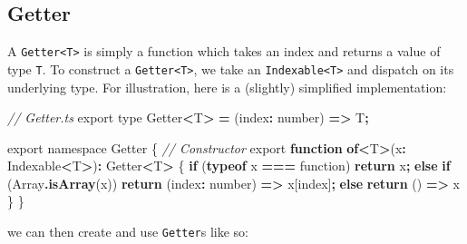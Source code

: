 \documentclass[
]{book}
\newenvironment{Shaded}{\begin{snugshade}}{\end{snugshade}}
\newcommand{\BuiltInTok}[1]{#1}
\newcommand{\CommentTok}[1]{\textcolor[rgb]{0.56,0.35,0.01}{\textit{#1}}}
\newcommand{\ControlFlowTok}[1]{\textcolor[rgb]{0.13,0.29,0.53}{\textbf{#1}}}
\newcommand{\DataTypeTok}[1]{\textcolor[rgb]{0.13,0.29,0.53}{#1}}
\newcommand{\FunctionTok}[1]{\textcolor[rgb]{0.13,0.29,0.53}{\textbf{#1}}}
\newcommand{\ImportTok}[1]{#1}
\newcommand{\KeywordTok}[1]{\textcolor[rgb]{0.13,0.29,0.53}{\textbf{#1}}}
\newcommand{\NormalTok}[1]{#1}
\newcommand{\OperatorTok}[1]{\textcolor[rgb]{0.81,0.36,0.00}{\textbf{#1}}}
\newcommand{\VerbatimStringTok}[1]{\textcolor[rgb]{0.31,0.60,0.02}{#1}}
\theoremstyle{definition}
\theoremstyle{definition}
\theoremstyle{definition}
\theoremstyle{definition}
\theoremstyle{remark}
\begin{document}
\subsection{Getter}\label{Getter}

A \texttt{Getter\textless{}T\textgreater{}} is simply a function which takes an index and returns a value of type \texttt{T}. To construct a \texttt{Getter\textless{}T\textgreater{}}, we take an \texttt{Indexable\textless{}T\textgreater{}} and dispatch on its underlying type. For illustration, here is a (slightly) simplified implementation:

\begin{Shaded}
\begin{Highlighting}[]
\CommentTok{// Getter.ts}
\ImportTok{export type}\NormalTok{ Getter}\OperatorTok{\textless{}}\NormalTok{T}\OperatorTok{\textgreater{}} \OperatorTok{=}\NormalTok{ (index}\OperatorTok{:} \DataTypeTok{number}\NormalTok{) }\KeywordTok{=\textgreater{}}\NormalTok{ T}\OperatorTok{;}

\ImportTok{export} \ImportTok{namespace} \DataTypeTok{Getter}\NormalTok{ \{}
  \CommentTok{// Constructor}
  \ImportTok{export} \KeywordTok{function} \KeywordTok{of}\OperatorTok{\textless{}}\NormalTok{T}\OperatorTok{\textgreater{}}\NormalTok{(x}\OperatorTok{:}\NormalTok{ Indexable}\OperatorTok{\textless{}}\NormalTok{T}\OperatorTok{\textgreater{}}\NormalTok{)}\OperatorTok{:}\NormalTok{ Getter}\OperatorTok{\textless{}}\NormalTok{T}\OperatorTok{\textgreater{}}\NormalTok{ \{}
    \ControlFlowTok{if}\NormalTok{ (}\KeywordTok{typeof}\NormalTok{ x }\OperatorTok{===} \VerbatimStringTok{\textasciigrave{}function\textasciigrave{}}\NormalTok{) }\ControlFlowTok{return}\NormalTok{ x}\OperatorTok{;}
    \ControlFlowTok{else} \ControlFlowTok{if}\NormalTok{ (}\BuiltInTok{Array}\OperatorTok{.}\FunctionTok{isArray}\NormalTok{(x)) }\ControlFlowTok{return}\NormalTok{ (index}\OperatorTok{:} \DataTypeTok{number}\NormalTok{) }\KeywordTok{=\textgreater{}}\NormalTok{ x[index]}\OperatorTok{;}
    \ControlFlowTok{else} \ControlFlowTok{return}\NormalTok{ () }\KeywordTok{=\textgreater{}}\NormalTok{ x}
\NormalTok{  \}}
\NormalTok{\}}
\end{Highlighting}
\end{Shaded}

we can then create and use \texttt{Getter}s like so:
\end{document}
